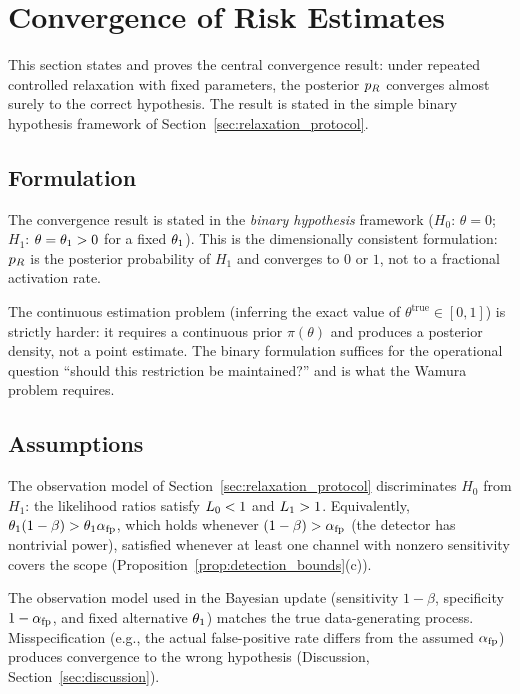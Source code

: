 \section{Convergence of Risk Estimates}
\label{sec:convergence}

This section states and proves the central convergence result:
under repeated controlled relaxation with fixed parameters, the
posterior $p_R$ converges almost surely to the correct
hypothesis.  The result is stated in the simple binary
hypothesis framework of Section~\ref{sec:relaxation_protocol}.

\subsection{Formulation}

The convergence result is stated in the \emph{binary hypothesis}
framework ($H_0$: $\theta = 0$; $H_1$: $\theta = \theta_1 > 0$
for a fixed $\theta_1$).  This is the dimensionally consistent
formulation: $p_R$ is the posterior probability of $H_1$ and
converges to $0$ or $1$, not to a fractional activation rate.

The continuous estimation problem (inferring the exact value of
$\theta^{\mathrm{true}} \in [0, 1]$) is strictly harder: it
requires a continuous prior $\pi(\theta)$ and produces a
posterior density, not a point estimate.  The binary formulation
suffices for the operational question ``should this restriction
be maintained?'' and is what the Wamura problem requires.

\subsection{Assumptions}

\begin{assumption}
\label{ass:T1}
The observation model of
Section~\ref{sec:relaxation_protocol} discriminates $H_0$ from
$H_1$: the likelihood ratios satisfy $L_0 < 1$ and
$L_1 > 1$.  Equivalently,
$\theta_1 (1 - \beta) > \theta_1 \alpha_{\mathrm{fp}}$, which holds
whenever $(1 - \beta) > \alpha_{\mathrm{fp}}$ (the detector has nontrivial
power), satisfied whenever at least one channel with nonzero
sensitivity covers the scope
(Proposition~\ref{prop:detection_bounds}(c)).
\end{assumption}

\begin{assumption}
\label{ass:T2}
The observation model used in the Bayesian update (sensitivity
$1 - \beta$, specificity $1 - \alpha_{\mathrm{fp}}$, and fixed alternative
$\theta_1$) matches the true data-generating process.
Misspecification (e.g., the actual false-positive rate differs
from the assumed $\alpha_{\mathrm{fp}}$) produces convergence to the wrong
hypothesis (Discussion,
Section~\ref{sec:discussion}).
\end{assumption}

